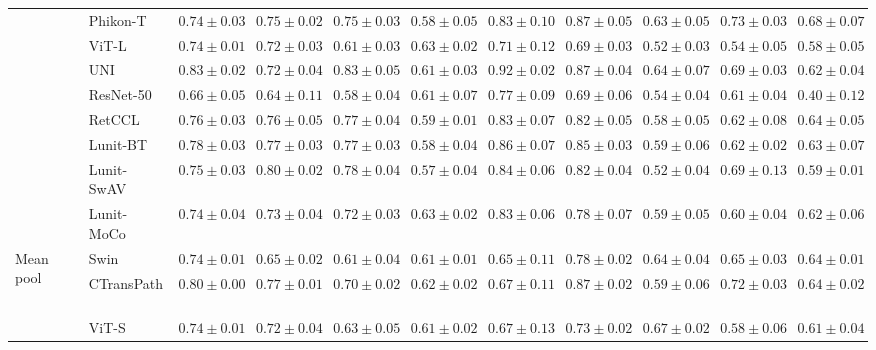 \begin{tabular}{ll|cccc|c|cccc}
 & Phikon-T~\cite{filiot2023scaling} & $0.74 \pm 0.03$ & $0.75 \pm 0.02$ & $0.75 \pm 0.03$ & $0.58 \pm 0.05$ & $0.83 \pm 0.10$ & $0.87 \pm 0.05$ & $0.63 \pm 0.05$ & $\mathbf{0.73 \pm 0.03}$ & $\mathbf{0.68 \pm 0.07}$ \\
 & ViT-L~\cite{kolesnikov2021image} & $0.74 \pm 0.01$ & $0.72 \pm 0.03$ & $0.61 \pm 0.03$ & $0.63 \pm 0.02$ & $0.71 \pm 0.12$ & $0.69 \pm 0.03$ & $0.52 \pm 0.03$ & $0.54 \pm 0.05$ & $0.58 \pm 0.05$ \\
 & UNI~\cite{chen2024uni} & $\mathbf{0.83 \pm 0.02}$ & $0.72 \pm 0.04$ & $\mathbf{0.83 \pm 0.05}$ & $0.61 \pm 0.03$ & $\mathbf{0.92 \pm 0.02}$ & $0.87 \pm 0.04$ & $\mathbf{0.64 \pm 0.07}$ & $0.69 \pm 0.03$ & $0.62 \pm 0.04$ \\
 & ResNet-50~\cite{he2015deep} & $0.66 \pm 0.05$ & $0.64 \pm 0.11$ & $0.58 \pm 0.04$ & $0.61 \pm 0.07$ & $0.77 \pm 0.09$ & $0.69 \pm 0.06$ & $0.54 \pm 0.04$ & $0.61 \pm 0.04$ & $0.40 \pm 0.12$ \\
 & RetCCL~\cite{wang2023retccl} & $0.76 \pm 0.03$ & $0.76 \pm 0.05$ & $0.77 \pm 0.04$ & $0.59 \pm 0.01$ & $0.83 \pm 0.07$ & $0.82 \pm 0.05$ & $0.58 \pm 0.05$ & $0.62 \pm 0.08$ & $0.64 \pm 0.05$ \\
 & Lunit-BT~\cite{kang2023benchmarking} & $0.78 \pm 0.03$ & $0.77 \pm 0.03$ & $0.77 \pm 0.03$ & $0.58 \pm 0.04$ & $0.86 \pm 0.07$ & $0.85 \pm 0.03$ & $0.59 \pm 0.06$ & $0.62 \pm 0.02$ & $0.63 \pm 0.07$ \\
 & Lunit-SwAV~\cite{kang2023benchmarking} & $0.75 \pm 0.03$ & $\mathbf{0.80 \pm 0.02}$ & $0.78 \pm 0.04$ & $0.57 \pm 0.04$ & $0.84 \pm 0.06$ & $0.82 \pm 0.04$ & $0.52 \pm 0.04$ & $0.69 \pm 0.13$ & $0.59 \pm 0.01$ \\
 & Lunit-MoCo~\cite{kang2023benchmarking} & $0.74 \pm 0.04$ & $0.73 \pm 0.04$ & $0.72 \pm 0.03$ & $\mathbf{0.63 \pm 0.02}$ & $0.83 \pm 0.06$ & $0.78 \pm 0.07$ & $0.59 \pm 0.05$ & $0.60 \pm 0.04$ & $0.62 \pm 0.06$ \\
\cline{1-11}
\multirow[t]{14}{*}{Mean pool} & Swin~\cite{liu2021swin} & $0.74 \pm 0.01$ & $0.65 \pm 0.02$ & $0.61 \pm 0.04$ & $0.61 \pm 0.01$ & $0.65 \pm 0.11$ & $0.78 \pm 0.02$ & $0.64 \pm 0.04$ & $0.65 \pm 0.03$ & $0.64 \pm 0.01$ \\
 & CTransPath~\cite{wang2022transformer} & $0.80 \pm 0.00$ & $0.77 \pm 0.01$ & $0.70 \pm 0.02$ & $\mathbf{0.62 \pm 0.02}$ & $0.67 \pm 0.11$ & $0.87 \pm 0.02$ & $0.59 \pm 0.06$ & $0.72 \pm 0.03$ & $0.64 \pm 0.02$ \\
 & ViT-S~\cite{kolesnikov2021image} & $0.74 \pm 0.01$ & $0.72 \pm 0.04$ & $0.63 \pm 0.05$ & $0.61 \pm 0.02$ & $0.67 \pm 0.13$ & $0.73 \pm 0.02$ & $\mathbf{0.67 \pm 0.02}$ & $0.58 \pm 0.06$ & $0.61 \pm 0.04$ \\

\end{tabular}
